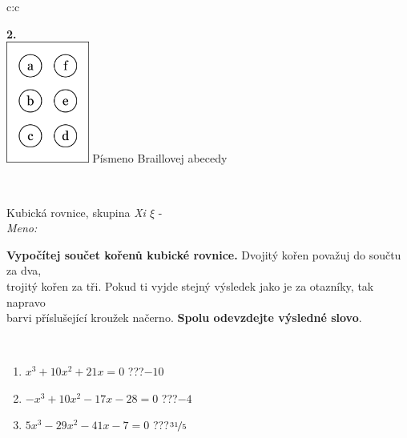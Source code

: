\documentclass[10pt]{report}
\begin{document}
\begin{tabular}{c:c}
\begin{minipage}[c][104.5mm][t]{0.5\linewidth}
\begin{center}
\begin{minipage}{0.79\linewidth}
\begin{center}
\begin{varwidth}{\linewidth}
\end{varwidth}
\end{center}
\end{minipage}
\begin{minipage}{0.20\linewidth}
\begin{center}
{\Huge\bfseries 2.} \\[2mm]
\includegraphics[height=40mm]{../images/braille.png}
{\small Písmeno Braillovej abecedy}
\end{center}
\end{minipage}
\end{center}
\end{minipage}
\\ \hdashline
\begin{minipage}[c][104.5mm][t]{0.5\linewidth}
\begin{center}
\vspace{7mm}
{\huge Kubická rovnice, skupina \textit{Xi $\xi$} -}\\[5mm]
\textit{Meno:}\phantom{xxxxxxxxxxxxxxxxxxxxxxxxxxxxxxxxxxxxxxxxxxxxxxxxxxxxxxxxxxxxxxxxx}\\[5mm]
\begin{minipage}{0.95\linewidth}
\textbf{Vypočítej součet kořenů kubické rovnice.} Dvojitý kořen považuj do součtu za dva,\\trojitý kořen za tři. Pokud ti vyjde stejný výsledek jako je za otazníky, tak napravo\\barvi příslušející kroužek načerno. \textbf{Spolu odevzdejte výsledné slovo}.
\end{minipage}
\\[1mm]
\begin{minipage}{0.79\linewidth}
\begin{center}
\begin{varwidth}{\linewidth}
\begin{enumerate}
\Large
\item $x^3+10x^2+21x=0$\quad \dotfill\; ???\;\dotfill \quad $-10$
\item $-x^3+10x^2-17x-28=0$\quad \dotfill\; ???\;\dotfill \quad $-4$
\item $5x^3-29x^2-41x-7=0$\quad \dotfill\; ???\;\dotfill \quad $\nicefrac{31}{5}$

\end{enumerate}
\end{varwidth}
\end{center}
\end{minipage}
\end{center}
\end{minipage}
\end{tabular}
\end{document}
